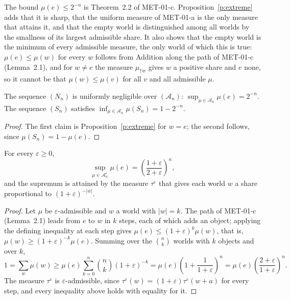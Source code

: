 \documentclass{situationist-preprint}
\begin{document}
The bound $\mu(e) \leq 2^{-n}$ is Theorem~2.2 of MET-01-c. Proposition~\ref{p:extreme} adds that it is sharp, that the uniform measure of MET-01-a is the only measure that attains it, and that the empty world is distinguished among all worlds by the smallness of its largest admissible share. It also shows that the empty world is the minimum of every admissible measure, the only world of which this is true: $\mu(e) \leq \mu(w)$ for every $w$ follows from Addition along the path of MET-01-c (Lemma~2.1), and for $w \neq e$ the measure $\mu_{\mathord{\uparrow} w}$ gives $w$ a positive share and $e$ none, so it cannot be that $\mu(w) \leq \mu(v)$ for all $v$ and all admissible $\mu$.

\begin{theorem}\label{t:uniform}
The sequence $(N_n)$ is uniformly negligible over $(\mathcal{A}_n)$: $\sup_{\mu \in \mathcal{A}_n} \mu(e) = 2^{-n}$. The sequence $(S_n)$ satisfies $\inf_{\mu \in \mathcal{A}_n} \mu(S_n) = 1 - 2^{-n}$.
\end{theorem}

\begin{proof}
The first claim is Proposition~\ref{p:extreme} for $w = e$; the second follows, since $\mu(S_n) = 1 - \mu(e)$.
\end{proof}

\begin{proposition}[Tolerance]\label{p:tol}
For every $\varepsilon \geq 0$,
\[
\sup_{\mu \in \mathcal{A}_n^{\varepsilon}} \mu(e) = \left(\frac{1 + \varepsilon}{2 + \varepsilon}\right)^{n},
\]
and the supremum is attained by the measure $\tau^{\varepsilon}$ that gives each world $w$ a share proportional to $(1 + \varepsilon)^{-|w|}$.
\end{proposition}

\begin{proof}
Let $\mu$ be $\varepsilon$-admissible and $w$ a world with $|w| = k$. The path of MET-01-c (Lemma~2.1) leads from $e$ to $w$ in $k$ steps, each of which adds an object; applying the defining inequality at each step gives $\mu(e) \leq (1 + \varepsilon)^k \mu(w)$, that is, $\mu(w) \geq (1+\varepsilon)^{-k}\mu(e)$. Summing over the $\binom{n}{k}$ worlds with $k$ objects and over $k$,
\[
1 = \sum_w \mu(w) \geq \mu(e) \sum_{k=0}^{n} \binom{n}{k} (1+\varepsilon)^{-k} = \mu(e) \left(1 + \frac{1}{1+\varepsilon}\right)^{n} = \mu(e)\left(\frac{2+\varepsilon}{1+\varepsilon}\right)^n.
\]
The measure $\tau^{\varepsilon}$ is $\varepsilon$-admissible, since $\tau^{\varepsilon}(w) = (1+\varepsilon)\tau^{\varepsilon}(w + a)$ for every step, and every inequality above holds with equality for it.
\end{proof}
\end{document}
